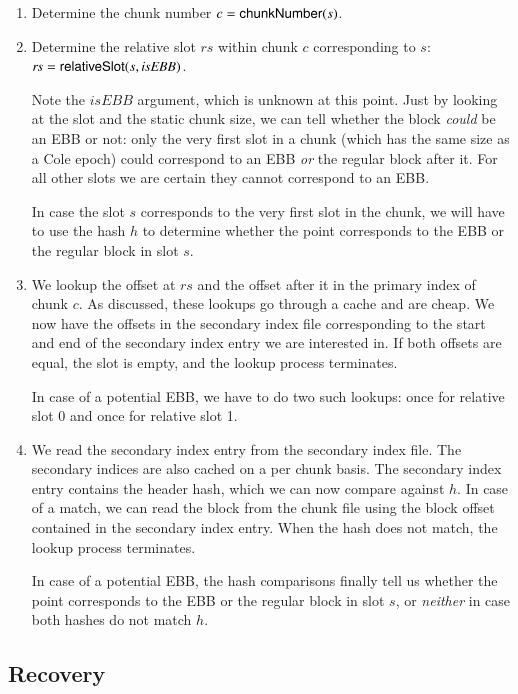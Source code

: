 \begin{enumerate}
\item Determine the chunk number $c = \mathsf{chunkNumber}(s)$.
\item Determine the relative slot $\mathit{rs}$ within chunk $c$ corresponding
  to $s$: $\mathit{rs} = \mathsf{relativeSlot}(s, \mathit{isEBB})$.

  Note the $\mathit{isEBB}$ argument, which is unknown at this point. Just by
  looking at the slot and the static chunk size, we can tell whether the block
  \emph{could} be an EBB or not: only the very first slot in a chunk (which has
  the same size as a Cole epoch) could correspond to an EBB \emph{or} the
  regular block after it. For all other slots we are certain they cannot
  correspond to an EBB.

  In case the slot $s$ corresponds to the very first slot in the chunk, we will
  have to use the hash $h$ to determine whether the point corresponds to the EBB
  or the regular block in slot $s$.
\item We lookup the offset at $\mathit{rs}$ and the offset after it in the
  primary index of chunk $c$. As discussed, these lookups go through a cache and
  are cheap. We now have the offsets in the secondary index file corresponding
  to the start and end of the secondary index entry we are interested in. If
  both offsets are equal, the slot is empty, and the lookup process terminates.

  In case of a potential EBB, we have to do two such lookups: once for relative
  slot 0 and once for relative slot 1.

\item We read the secondary index entry from the secondary index file. The
  secondary indices are also cached on a per chunk basis. The secondary index
  entry contains the header hash, which we can now compare against $h$. In case
  of a match, we can read the block from the chunk file using the block offset
  contained in the secondary index entry. When the hash does not match, the
  lookup process terminates.

  In case of a potential EBB, the hash comparisons finally tell us whether the
  point corresponds to the EBB or the regular block in slot $s$, or
  \emph{neither} in case both hashes do not match $h$.
\end{enumerate}

\subsection{Recovery}
\label{immutable:implementation:recovery}

